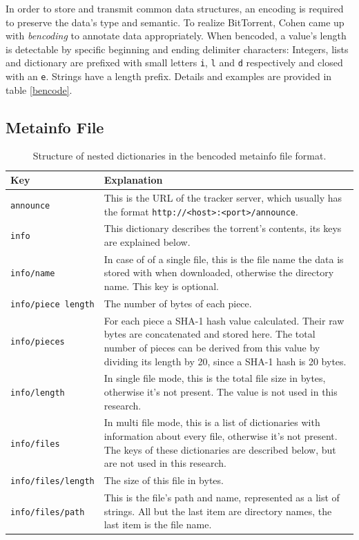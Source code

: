 \documentclass[10pt, a4paper, twoside, headsepline]{scrbook}
\renewcommand{\_}{\origunderscore\allowbreak}
\begin{document}
In order to store and transmit common data structures, an encoding is required to preserve the data's type and semantic. To realize BitTorrent, Cohen came up with \emph{bencoding} to annotate data appropriately. When bencoded, a value's length is detectable by specific beginning and ending delimiter characters: Integers, lists and dictionary are prefixed with small letters \texttt{i}, \texttt{l} and \texttt{d} respectively and closed with an \texttt{e}. Strings have a length prefix. Details and examples are provided in table \ref{bencode}.

\subsection{Metainfo File}
\begin{table}
\centering
\begin{tabularx}{\textwidth}{lX}
\toprule
Key & Explanation \\
\midrule
\texttt{announce} & This is the URL of the tracker server, which usually has the format \nolinkurl{http://<host>:<port>/announce}. \\
\texttt{info} & This dictionary describes the torrent's contents, its keys are explained below. \\
\texttt{info/name} & In case of of a single file, this is the file name the data is stored with when downloaded, otherwise the directory name. This key is optional. \\
\texttt{info/piece length} & The number of bytes of each piece. \\
\texttt{info/pieces} & For each piece a SHA-1 hash value calculated. Their raw bytes are concatenated and stored here. The total number of pieces can be derived from this value by dividing its length by 20, since a SHA-1 hash is 20 bytes. \\
\texttt{info/length} & In single file mode, this is the total file size in bytes, otherwise it's not present. The value is not used in this research. \\
\texttt{info/files} & In multi file mode, this is a list of dictionaries with information about every file, otherwise it's not present. The keys of these dictionaries are described below, but are not used in this research. \\
\texttt{info/files/length} & The size of this file in bytes. \\
\texttt{info/files/path} & This is the file's path and name, represented as a list of strings. All but the last item are directory names, the last item is the file name. \\
\bottomrule
\end{tabularx}
\caption[Structure of the metainfo file format]{Structure of nested dictionaries in the bencoded metainfo file format.}
\label{metainfo-file}
\end{table}
\end{document}
